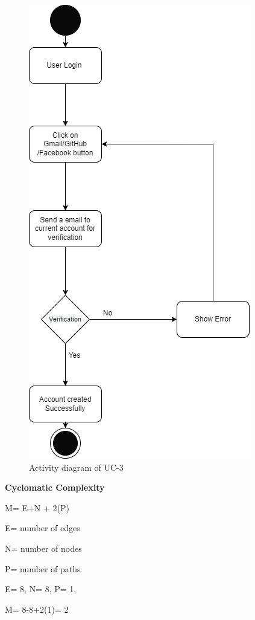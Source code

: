 \begin{figure}[H]
    \centering
    \includegraphics[scale=0.7]{./diagrams/Activity Diagram/ad-03.png}
    \caption{Activity diagram of UC-3}
    \label{fig:act-03}

\end{figure}

\textbf{Cyclomatic Complexity}

M= E+N + 2(P)

E= number of edges

N= number of nodes

P= number of paths

E= 8,
N= 8,
P= 1,

M= 8-8+2(1)= 2

